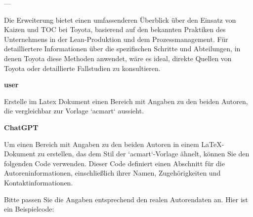 ---

Die Erweiterung bietet einen umfassenderen Überblick über den Einsatz von Kaizen und TOC bei Toyota, basierend auf den bekannten Praktiken des Unternehmens in der Lean-Produktion und dem Prozessmanagement. Für detailliertere Informationen über die spezifischen Schritte und Abteilungen, in denen Toyota diese Methoden anwendet, wäre es ideal, direkte Quellen von Toyota oder detaillierte Fallstudien zu konsultieren.

\textbf{user}

Erstelle im Latex Dokument einen Bereich mit Angaben zu den beiden Autoren, die vergleichbar zur Vorlage `acmart` aussieht.

\textbf{ChatGPT}

Um einen Bereich mit Angaben zu den beiden Autoren in einem LaTeX-Dokument zu erstellen, das dem Stil der `acmart`-Vorlage ähnelt, können Sie den folgenden Code verwenden. Dieser Code definiert einen Abschnitt für die Autoreninformationen, einschließlich ihrer Namen, Zugehörigkeiten und Kontaktinformationen.

Bitte passen Sie die Angaben entsprechend den realen Autorendaten an. Hier ist ein Beispielcode:

